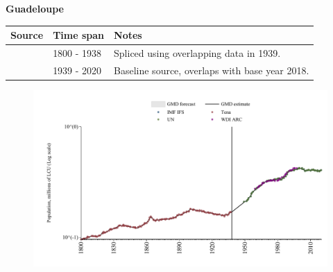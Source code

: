 \documentclass[12pt,a4paper,landscape]{article}
\begin{document}
\begin{adjustbox}{max totalsize={\paperwidth}{\paperheight},center}
\begin{minipage}[t][\textheight][t]{\textwidth}
\vspace*{0.5cm}
{}
\begin{center}
{\Large\bfseries Guadeloupe}
\end{center}
\vspace{0.5cm}
\begin{table}[H]
\centering
\small
\begin{tabular}{|l|l|l|}
\hline
\textbf{Source} & \textbf{Time span} & \textbf{Notes} \\
\hline
\rowcolor{white}\cite{Tena}& 1800 - 1938 &Spliced using overlapping data in 1939.\\
\rowcolor{lightgray}\cite{IMF_IFS}& 1939 - 2020 &Baseline source, overlaps with base year 2018.\\
\hline
\end{tabular}
\end{table}
\begin{figure}[H]
\centering
\includegraphics[width=\textwidth,height=0.6\textheight,keepaspectratio]{graphs/GLP_pop.pdf}
\end{figure}
\end{minipage}
\end{adjustbox}
\end{document}
